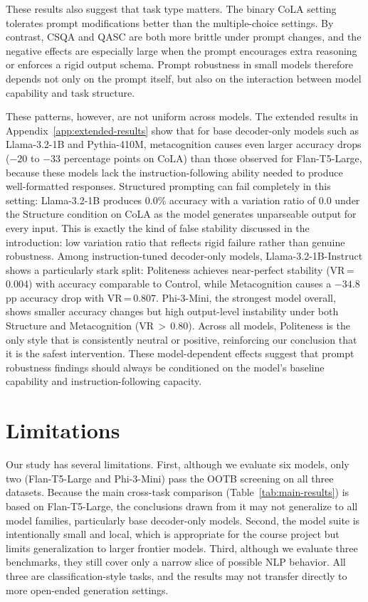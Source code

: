 \documentclass[11pt]{article}
\begin{document}
These results also suggest that task type matters. The binary CoLA setting tolerates prompt modifications better than the multiple-choice settings. By contrast, CSQA and QASC are both more brittle under prompt changes, and the negative effects are especially large when the prompt encourages extra reasoning or enforces a rigid output schema. Prompt robustness in small models therefore depends not only on the prompt itself, but also on the interaction between model capability and task structure.

These patterns, however, are not uniform across models. The extended results in Appendix~\ref{app:extended-results} show that for base decoder-only models such as Llama-3.2-1B and Pythia-410M, metacognition causes even larger accuracy drops ($-20$ to $-33$ percentage points on CoLA) than those observed for Flan-T5-Large, because these models lack the instruction-following ability needed to produce well-formatted responses. Structured prompting can fail completely in this setting: Llama-3.2-1B produces 0.0\% accuracy with a variation ratio of 0.0 under the Structure condition on CoLA as the model generates unparseable output for every input. This is exactly the kind of false stability discussed in the introduction: low variation ratio that reflects rigid failure rather than genuine robustness. Among instruction-tuned decoder-only models, Llama-3.2-1B-Instruct shows a particularly stark split: Politeness achieves near-perfect stability (VR\,=\,0.004) with accuracy comparable to Control, while Metacognition causes a $-34.8$ pp accuracy drop with VR\,=\,0.807. Phi-3-Mini, the strongest model overall, shows smaller accuracy changes but high output-level instability under both Structure and Metacognition (VR\,$>$\,0.80). Across all models, Politeness is the only style that is consistently neutral or positive, reinforcing our conclusion that it is the safest intervention. These model-dependent effects suggest that prompt robustness findings should always be conditioned on the model's baseline capability and instruction-following capacity.

\section{Limitations}

Our study has several limitations. First, although we evaluate six models, only two (Flan-T5-Large and Phi-3-Mini) pass the OOTB screening on all three datasets. Because the main cross-task comparison (Table~\ref{tab:main-results}) is based on Flan-T5-Large, the conclusions drawn from it may not generalize to all model families, particularly base decoder-only models. Second, the model suite is intentionally small and local, which is appropriate for the course project but limits generalization to larger frontier models. Third, although we evaluate three benchmarks, they still cover only a narrow slice of possible NLP behavior. All three are classification-style tasks, and the results may not transfer directly to more open-ended generation settings.
\end{document}
